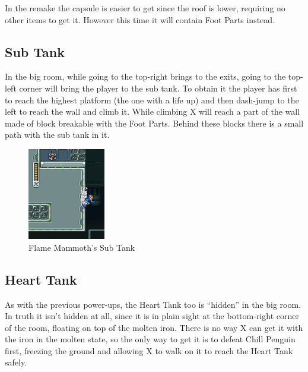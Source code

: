 In the \mhx remake the capsule is easier to get since the roof is lower, requiring no other items to get it. However this time it will contain Foot Parts instead.

\subsection{Sub Tank}
In the big room, while going to the top-right brings to the exits, going to the top-left corner will bring the player to the sub tank. To obtain it the player has first to reach the highest platform (the one with a life up) and then dash-jump to the left to reach the wall and climb it. While climbing X will reach a part of the wall made of block breakable with the Foot Parts. Behind these blocks there is a small path with the sub tank in it.
\begin{figure}[h]
	\centering
	\includegraphics[height=4cm]{figures/X1/Flame_mammoth/Flame_tank.jpg}
	\caption{Flame Mammoth's Sub Tank}
\end{figure}



\subsection{Heart Tank}
As with the previous power-ups, the Heart Tank too is ``hidden'' in the big room. In truth it isn't hidden at all, since it is in plain sight at the bottom-right corner of the room, floating on top of the molten iron. There is no way X can get it with the iron in the molten state, so the only way to get it is to defeat Chill Penguin first, freezing the ground and allowing X to walk on it to reach the Heart Tank safely.

